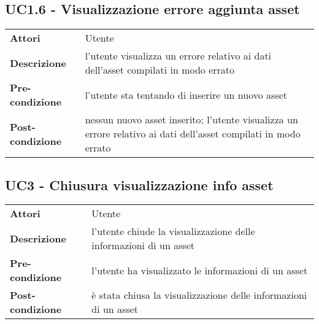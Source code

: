 \subsection{UC1.6 - Visualizzazione errore aggiunta asset}
\label{sssec:UC1.6}
\def\arraystretch{1.5}
\begin{tabularx}{\textwidth}{l|p{}}
\rowcolor{I} \multicolumn{2}{c}{\color{white}\textbf{UC1.6 - Visualizzazione errore aggiunta asset}} \\
\toprule
\endhead
\textbf{Attori} & Utente\\
\textbf{Descrizione} & l'utente visualizza un errore relativo ai dati dell'asset compilati in modo errato\\
\textbf{Pre-condizione} & l'utente sta tentando di inserire un nuovo asset\\
\textbf{Post-condizione} & nessun nuovo asset inserito; l'utente visualizza un errore relativo ai dati dell'asset compilati in modo errato\\
\bottomrule
\end{tabularx}
\subsection{UC3 - Chiusura visualizzazione info asset}
\label{sssec:UC3}
\def\arraystretch{1.5}
\begin{tabularx}{\textwidth}{l|p{}}
\rowcolor{I} \multicolumn{2}{c}{\color{white}\textbf{UC3 - Chiusura visualizzazione info asset}} \\
\toprule
\endhead
\textbf{Attori} & Utente\\
\textbf{Descrizione} & l'utente chiude la visualizzazione delle informazioni di un asset\\
\textbf{Pre-condizione} & l'utente ha visualizzato le informazioni di un asset\\
\textbf{Post-condizione} & è stata chiusa la visualizzazione delle informazioni di un asset\\
\bottomrule
\end{tabularx}
